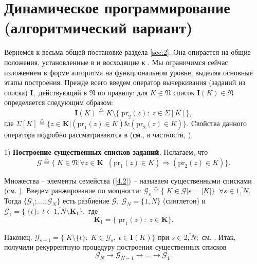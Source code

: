\documentclass[10pt]{SPIIRAS_Proceedings}
\begin{document}
\section{Динамическое программирование (алгоритмический вариант)}
\label{sec:4}

Вернемся к весьма общей постановке раздела \ref{sec:2}.
Она опирается на общие положения, установленные в \cite{19,20}
и восходящие к \cite[$\S$4.9]{14}.
Мы ограничимся сейчас изложением в форме алгоритма на функциональном уровне,
выделяя основные этапы построения.
Прежде всего введем оператор вычеркивания
(заданий из списка)
$\mathbf{I},$ действующий в $\mathfrak{N}$ по правилу:
для
$K \in \mathfrak{N}$ список $\mathbf{I}(K) \in \mathfrak{N}$
определяется следующим образом:
\begin{equation}\label{4.1}
  \mathbf{I}(K) \stackrel{\triangle}{=} K \setminus \{\;\mathrm{pr}_2(z):\;z \in \Sigma[K]\},
\end{equation}
где
$\Sigma[K] \stackrel{\triangle}{=} \{z \in \mathbf{K} \vert (\mathrm{pr}_1(z) \in K) \& (\mathrm{pr}_2(z) \in K)\}.$
Cвойства данного оператора подробно рассматриваются в \cite[часть 2]{14}
(см., в частности, \cite[раздел 2.2]{14}).

1) {\bf Построение существенных списков заданий.}
Полагаем, что
\begin{equation}\label{4.2}
  \mathcal{G} \stackrel{\triangle}{=} \{\;K \in \mathfrak{N} \vert
  \forall{z} \in \mathbf{K}\;\;(\mathrm{pr}_1(z) \in K) \Longrightarrow (\mathrm{pr}_2(z) \in K)\}.
\end{equation}

Множества -- элементы семейства (\ref{4.2}) --
называем существенными списками
(см. \cite[раздел 4.9]{14}).
Введем ранжирование по мощности:
$\mathcal{G}_s \stackrel{\triangle}{=} \{\;K \in \mathcal{G} \vert s = |K|\}\;\;\forall{s} \in \overline{1,N}.$
Тогда
$\{\mathcal{G}_1;...;\mathcal{G}_N\}$
есть разбиение
$\mathcal{G},\;\mathcal{G}_N = \{\overline{1,N}\}$
(синглетон)
и
$\mathcal{G}_1 = \{\;\{t\}:\;t \in \overline{1,N} \setminus \mathbf{K}_1\},$
где
\begin{equation}\label{4.3}
  \mathbf{K}_1 = \{\;\mathrm{pr}_1(z):\;z \in \mathbf{K}\}.
\end{equation}

Наконец,
$\mathcal{G}_{s-1} = \{\;K \setminus\{t\}:\;K \in \mathcal{G}_s,\;t \in \mathbf{I}(K)\}$ при $s \in \overline{2,N};$
см. \cite[$\S$3.5]{4}.
Итак, получили рекуррентную процедуру построения существенных списков
$$
  \mathcal{G}_N \longrightarrow \mathcal{G}_{N-1} \longrightarrow ... \longrightarrow \mathcal{G}_1.
$$
\end{document}
